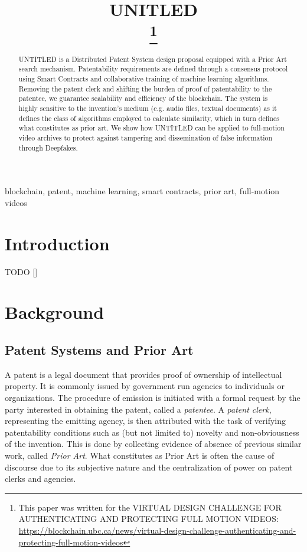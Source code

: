 \documentclass[conference]{IEEEtran}
\begin{document}
\title{UNITLED\\
\thanks{This paper was written for the VIRTUAL DESIGN CHALLENGE FOR AUTHENTICATING AND PROTECTING FULL MOTION VIDEOS: \url{https://blockchain.ubc.ca/news/virtual-design-challenge-authenticating-and-protecting-full-motion-videos}}
}

\author{
}

\maketitle

\begin{abstract}
UNTITLED is a Distributed Patent System design proposal equipped with a Prior Art search mechanism. Patentability requirements are defined through a consensus protocol using Smart Contracts and collaborative training of machine learning algorithms. Removing the patent clerk and shifting the burden of proof of patentability to the patentee, we guarantee scalability and efficiency of the blockchain. The system is highly sensitive to the invention’s medium (e.g. audio files, textual documents) as it defines the class of algorithms employed to calculate similarity, which in turn defines what constitutes as prior art. We show how UNTITLED can be applied to full-motion video archives to protect against tampering and dissemination of false information through Deepfakes.\end{abstract}

\begin{IEEEkeywords}
blockchain, patent, machine learning, smart contracts, prior art, full-motion videos
\end{IEEEkeywords}

\section{Introduction}
TODO []

\section{Background}
\subsection{Patent Systems and Prior Art}
A patent is a legal document that provides proof of ownership of intellectual property. It is commonly issued by government run agencies to individuals or organizations. The procedure of emission is initiated with a formal request by the party interested in obtaining the patent, called a \emph{patentee}. A \emph{patent clerk}, representing the emitting agency, is then attributed with the task of verifying patentability conditions such as (but not limited to) novelty and non-obviousness of the invention. This is done by collecting evidence of absence of previous similar work, called \emph{Prior Art}. What constitutes as Prior Art is often the cause of discourse due to its subjective nature and the centralization of power on patent clerks and agencies.
\end{document}
